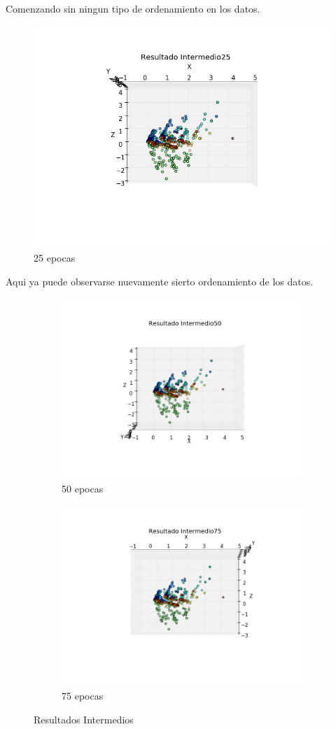 \pagebreak

Comenzando sin ningun tipo de ordenamiento en los datos.

\begin{figure}[h!]
  \centering
  \includegraphics[width=.6\linewidth]{convergencia_sanger/1.png}
\caption{25 epocas}
\label{fig:test}
\end{figure}

Aqui ya puede observarse nuevamente sierto ordenamiento de los datos.

\begin{figure}[h!]
\centering
\begin{subfigure}{.5\textwidth}
  \centering
  \includegraphics[width=.4\linewidth]{convergencia_sanger/2.png}
  \caption{50 epocas}
  \label{fig:sub1}
\end{subfigure}%
\begin{subfigure}{.5\textwidth}
  \centering
  \includegraphics[width=.4\linewidth]{convergencia_sanger/3.png}
  \caption{75 epocas}
  \label{fig:sub2}
\end{subfigure}
\caption{Resultados Intermedios}
\label{fig:test}
\end{figure}

